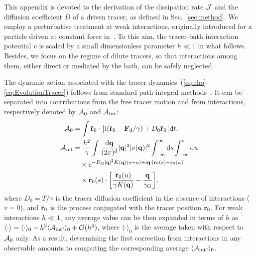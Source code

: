 \documentclass[superscriptaddress, twocolumn, prx, longbibliography, nofootinbib]{revtex4-1}
\begin{document}
This appendix is devoted to the derivation of the dissipation rate $\cal J$ and the diffusion coefficient $D$ of a driven tracer, as defined in Sec.~\ref{sec:method}. We employ a perturbative treatment at weak interactions, originally introduced for a particle driven at constant force in~\cite{Demery2011, Demery2014}. To this aim, the tracer-bath interaction potential $v$ is scaled by a small dimensionless parameter $h\ll1$ in what follows. Besides, we focus on the regime of dilute tracers, so that interactions among them, either direct or mediated by the bath, can be safely neglected.


The dynamic action associated with the tracer dynamics~(\ref{eq:rho}-\ref{eq:EvolutionTracer}) follows from standard path integral methods~\cite{Martin1973, Dominicis1975}. It can be separated into contributions from the free tracer motion and from interactions, respectively denoted by ${\cal A}_0$ and ${\cal A}_{\rm int}$:
\begin{equation}\label{eq:action_app}
	\begin{aligned}
		{\cal A}_0 &= \int \bar{\bf r}_0 \cdot \big[ {\rm i}(\dot{\bf r}_0 - {\bf F}_{\rm d}/\gamma) + D_0 \bar{\bf r}_0 \big] {\rm d}t ,
		\\
		{\cal A}_{\rm int} &= \frac{h^2}{\gamma} \int \frac{{\rm d}{\bf q}}{(2\pi)^d} |{\bf q}|^2 |v({\bf q})|^2 \int_{-\infty}^\infty {\rm d}s\int_{-\infty}^s{\rm d}u
		\\
		&\quad\times {\rm e}^{-D_{\rm G}|{\bf q}|^2K({\bf q})(s-u)+{\rm i}{\bf q}\cdot[{\bf r}_0(s)-{\bf r}_0(u)]}
		\\
		&\quad\times \bar{\bf r}_0(s) \cdot \bigg[ \frac{\bar{\bf r}_0(u)}{\gamma K({\bf q})} - \frac{{\bf q}}{\gamma_{\rm G}} \bigg] ,
	\end{aligned}
\end{equation}
where $D_0=T/\gamma$ is the tracer diffusion coefficient in the absence of interactions ($v=0$), and $\bar{\bf r}_0$ is the process conjugated with the tracer position ${\bf r}_0$. For weak interactions $h\ll1$, any average value can be then expanded in terms of $h$ as $\langle\cdot\rangle=\langle\cdot\rangle_0 - h^2 \langle{\cal A}_{\rm int}\cdot\rangle_0 + {\cal O}(h^4)$, where $\langle\cdot\rangle_0$ is the average taken with respect to ${\cal A}_0$ only. As a result, determining the first correction from interactions in any observable amounts to computing the corresponding average $\langle{\cal A}_{\rm int}\cdot\rangle_0$.
\end{document}
